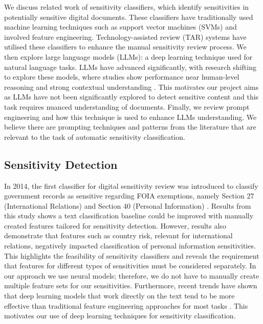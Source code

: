 \label{sec:background}
We discuss related work of sensitivity classifiers, which identify sensitivities in potentially sensitive digital documents. These classifiers have traditionally used machine learning techniques such as support vector machines (SVMs) and involved feature engineering. Technology-assisted review (TAR) systems have utilised these classifiers to enhance the manual sensitivity review process. We then explore large language models (LLMs): a deep learning technique used for natural language tasks. LLMs have advanced significantly, with research shifting to explore these models, where studies show performance near human-level reasoning and strong contextual understanding \cite{openai2023gpt}. This motivates our project aims as LLMs have not been significantly explored to detect sensitive content and this task requires nuanced understanding of documents. Finally, we review prompt engineering and how this technique is used to enhance LLMs understanding. We believe there are prompting techniques and patterns from the literature that are relevant to the task of automatic sensitivity classification.

\subsection{Sensitivity Detection}
\label{sec:background:sensitivity_detection}
In 2014, the first classifier for digital sensitivity review was introduced to classify government records as sensitive regarding FOIA exemptions, namely Section 27 (International Relations) and Section 40 (Personal Information) \cite{mcdonald2014towards}. Results from this study shows a text classification baseline could be improved with manually created features tailored for sensitivity detection. However, results also demonstrate that features such as country risk, relevant for international relations, negatively impacted classification of personal information sensitivities. This highlights the feasibility of sensitivity classifiers and reveals the requirement that features for different types of sensitivities must be considered separately. In our approach we use neural models; therefore, we do not have to manually create multiple feature sets for our sensitivities. Furthermore, recent trends have shown that deep learning models that work directly on the text tend to be more effective than traditional feature engineering approaches for most tasks \cite{otter2020survey}. This motivates our use of deep learning techniques for sensitivity classification.

